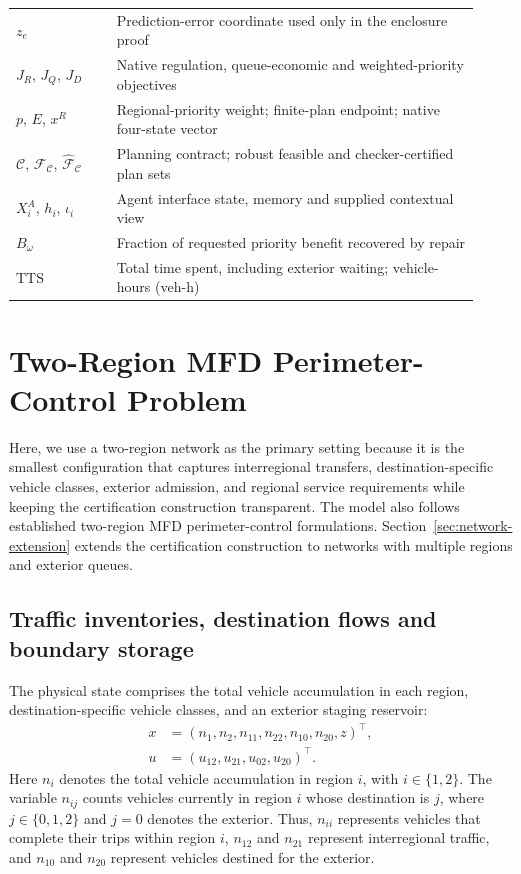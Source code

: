 \documentclass[preprint,12pt]{elsarticle}
\begin{document}
\begin{table}[!t]
\begin{tabular}{@{}p{0.20\linewidth}p{0.72\linewidth}@{}}
$z_e$ & Prediction-error coordinate used only in the enclosure proof\\
$J_R$, $J_Q$, $J_D$ & Native regulation, queue-economic and weighted-priority objectives\\
$p$, $E$, $x^R$ & Regional-priority weight; finite-plan endpoint; native four-state vector\\
$\mathcal C$, $\mathcal F_{\mathcal C}$, $\widehat{\mathcal F}_{\mathcal C}$ & Planning contract; robust feasible and checker-certified plan sets\\
$X_i^A$, $h_i$, $\iota_i$ & Agent interface state, memory and supplied contextual view\\
$B_\omega$ & Fraction of requested priority benefit recovered by repair\\
$\mathrm{TTS}$ & Total time spent, including exterior waiting; vehicle-hours (veh-h)\\
\bottomrule
\end{tabular}
\end{table}

\FloatBarrier
\section{Two-Region MFD Perimeter-Control Problem}
\label{sec:new-problem}
Here, we use a two-region network as the primary setting because it is the smallest
configuration that captures interregional transfers, destination-specific
vehicle classes, exterior admission, and regional service requirements while
keeping the certification construction transparent. The model also follows
established two-region MFD perimeter-control formulations. Section~\ref{sec:network-extension}
extends the certification construction to networks with multiple regions and
exterior queues.


\subsection{Traffic inventories, destination flows and boundary storage}

The physical state comprises the total vehicle accumulation in each region, destination-specific vehicle classes, and an exterior staging reservoir:
\begin{equation}
\begin{aligned}
x&=(n_1,n_2,n_{11},n_{22},n_{10},n_{20},z)^\top,\\
u&=(u_{12},u_{21},u_{02},u_{20})^\top.
\end{aligned}
\label{eq:new-state}
\end{equation}
Here $n_i$ denotes the total vehicle accumulation in region $i$, with
$i\in\{1,2\}$. The variable $n_{ij}$ counts vehicles currently in region
$i$ whose destination is $j$, where $j\in\{0,1,2\}$ and $j=0$ denotes the
exterior. Thus, $n_{ii}$ represents vehicles that complete their trips
within region $i$, $n_{12}$ and $n_{21}$ represent interregional traffic,
and $n_{10}$ and $n_{20}$ represent vehicles destined for the exterior.
\end{document}

